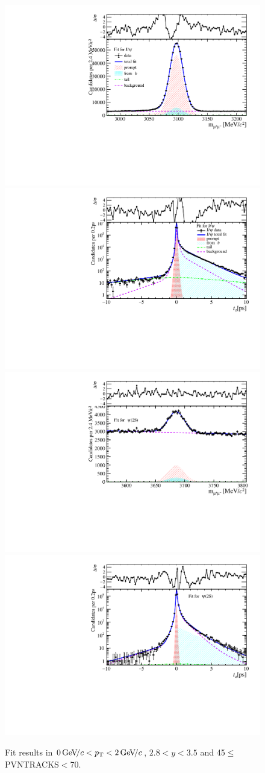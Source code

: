 \begin{figure}[H]
\begin{center}
\includegraphics[width=0.47\linewidth]{pdf/Jpsi/drawmass/n3y2pt1.pdf}
\includegraphics[width=0.47\linewidth]{pdf/Jpsi/2DFit/n3y2pt1.pdf}
\vspace*{-0.5cm}
\includegraphics[width=0.47\linewidth]{pdf/Psi2S/drawmass/n3y2pt1.pdf}
\includegraphics[width=0.47\linewidth]{pdf/Psi2S/2DFit/n3y2pt1.pdf}
\vspace*{-0.5cm}
\end{center}
\caption{Fit results in $0\text{\,Ge\kern -0.1em V\!/}c<p_{\mathrm{T}}<2\text{\,Ge\kern -0.1em V\!/}c$, $2.8<y<3.5$ and 45$\leq$PVNTRACKS$<$70.}
\label{Fitn3y2pt1}
\end{figure}
